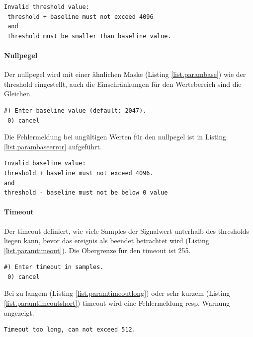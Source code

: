 \begin{lstlisting}[caption=Fehlermeldung ungültiger Threshold, label=list.paramthresfail]
 Invalid threshold value:
 threshold + baseline must not exceed 4096
 and
 threshold must be smaller than baseline value.
\end{lstlisting}

\paragraph{Nullpegel} Der \gls{nullpegel} wird mit einer ähnlichen Maske (Listing \ref{list.parambase}) wie der \gls{threshold} eingestellt, auch die Einschränkungen für den Wertebereich sind die Gleichen.

\begin{lstlisting}[caption=Untermenü Null-Level, label=list.parambase]
 #) Enter baseline value (default: 2047).
 0) cancel
\end{lstlisting}

Die Fehlermeldung bei ungültigen Werten für den \gls{nullpegel} ist in Listing \ref{list.parambaseerror} aufgeführt.

\begin{lstlisting}[caption=Fehlermeldung ungültiger Nullpegel, label=list.parambaseerror]
Invalid baseline value:
threshold + baseline must not exceed 4096.
and
threshold - baseline must not be below 0 value
\end{lstlisting}

\paragraph{Timeout} Der \gls{timeout} definiert, wie viele Samples der Signalwert unterhalb des \gls{threshold}s liegen kann, bevor das \gls{ereignis} als beendet betrachtet wird (Listing \ref{list.paramtimeout}). Die Obergrenze für den \gls{timeout} ist 255.

\begin{lstlisting}[caption=Untermenü Timeout, label=list.paramtimeout]
 #) Enter timeout in samples.
 0) cancel
\end{lstlisting}

Bei zu langem (Listing \ref{list.paramtimeoutlong}) oder sehr kurzem (Listing \ref{list.paramtimeoutshort}) \gls{timeout} wird eine Fehlermeldung resp. Warnung angezeigt.

\begin{lstlisting}[caption=Fehlermeldung zu langer Timeout, label=list.paramtimeoutlong]
Timeout too long, can not exceed 512.
\end{lstlisting}


